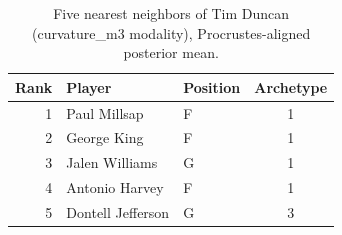 \begin{table}[htbp]
  \centering\small
  \begin{tabular}{rllc}
    \toprule
    Rank & Player & Position & Archetype \\
    \midrule
    1 & Paul Millsap & F & 1 \\
    2 & George King & F & 1 \\
    3 & Jalen Williams & G & 1 \\
    4 & Antonio Harvey & F & 1 \\
    5 & Dontell Jefferson & G & 3 \\
    \bottomrule
  \end{tabular}
  \caption{Five nearest neighbors of Tim Duncan (curvature_m3 modality), Procrustes-aligned posterior mean.}
  \label{tab:Tim_Duncan_neighbors_curvature_m3}
\end{table}

